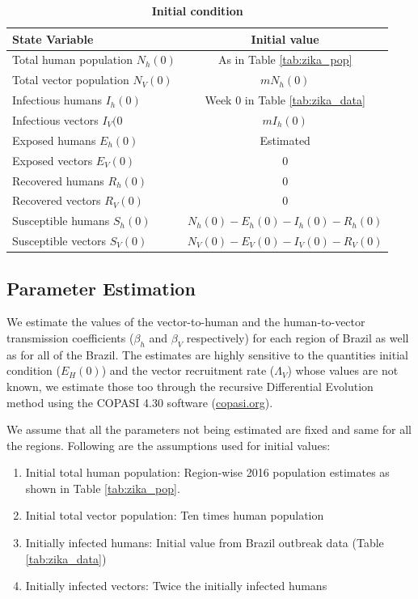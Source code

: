 \documentclass[10pt,letterpaper]{article}
\begin{document}
\begin{table}[]
    \centering
     \caption{\textbf{Initial condition}}
    \begin{tabular}{lc}\hline
        State Variable & Initial value  \\\hline
        Total human population $N_h(0)$    & As in Table \ref{tab:zika_pop} \\
        Total vector population $N_V(0)$ & $mN_h(0)$\\
        Infectious humans $I_h(0)$ & Week 0 in Table \ref{tab:zika_data}\\
        Infectious vectors $I_V(0$ & $mI_h(0)$\\
        Exposed humans $E_h(0)$ & Estimated \\
        Exposed vectors $E_V(0)$ & 0\\
        Recovered humans $R_h(0)$ & 0\\
        Recovered vectors $R_V(0)$ & 0\\
        Susceptible humans $S_h(0)$ & $N_h(0) - E_h(0) - I_h(0) - R_h(0)$\\
        Susceptible vectors $S_V(0)$ & $N_V(0) - E_V(0) - I_V(0) - R_V(0)$\\\hline
    \end{tabular}
   
    \label{tab:zika_init}
\end{table}

\subsection*{Parameter Estimation}

We estimate the values of the vector-to-human and the human-to-vector transmission coefficients ($\beta_h$ and $\beta_V$ respectively) for each region of Brazil as well as for all of the Brazil. The estimates are highly sensitive to the quantities initial condition ($E_H(0)$) and the vector recruitment rate ($\Lambda_V$) whose values are not known, we estimate those too through the recursive Differential Evolution method using the COPASI 4.30 software (\url{copasi.org}).

We assume that all the parameters not being estimated are fixed and same for all the regions. Following are the assumptions used for initial values:
\begin{enumerate}
    \item Initial total human population: Region-wise 2016 population estimates as shown in Table \ref{tab:zika_pop}.
    \item Initial total vector population: Ten times human population
    \item Initially infected humans: Initial value from Brazil outbreak data (Table \ref{tab:zika_data})
    \item Initially infected vectors: Twice the initially infected humans
\end{enumerate}
\end{document}
